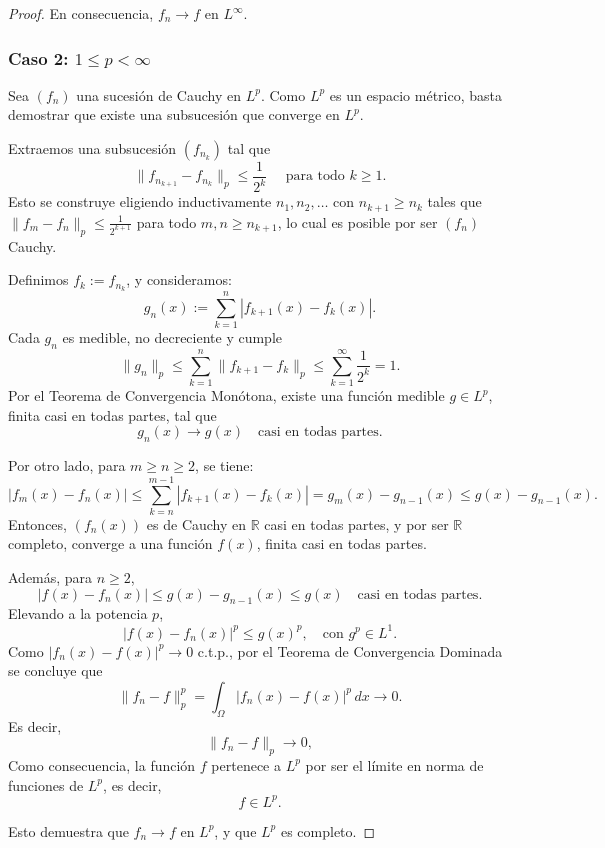 \begin{proof}
En consecuencia, \( f_n \to f \) en \( L^\infty \).

\subsubsection*{Caso 2: \( 1 \leq p < \infty \)}

Sea \( (f_n) \) una sucesión de Cauchy en \( L^p \). Como \( L^p \) es un espacio métrico, basta demostrar que existe una subsucesión que converge en \( L^p \).

Extraemos una subsucesión \( (f_{n_k}) \) tal que
\[
\|f_{n_{k+1}} - f_{n_k}\|_p \leq \frac{1}{2^k} \quad \text{ para todo } k \geq 1.
\]
Esto se construye eligiendo inductivamente \( n_1, n_2, \dots \) con \( n_{k+1} \geq n_k \) tales que \( \|f_m - f_n\|_p \leq \frac{1}{2^{k+1}} \) para todo \( m, n \geq n_{k+1} \), lo cual es posible por ser \( (f_n) \) Cauchy.

Definimos \( f_k := f_{n_k} \), y consideramos:
\[
g_n(x) := \sum_{k=1}^n |f_{k+1}(x) - f_k(x)|.
\]
Cada \( g_n \) es medible, no decreciente y cumple
\[
\|g_n\|_p \leq \sum_{k=1}^n \|f_{k+1} - f_k\|_p \leq \sum_{k=1}^\infty \frac{1}{2^k} = 1.
\]
Por el Teorema de Convergencia Monótona, existe una función medible \( g \in L^p \), finita casi en todas partes, tal que
\[
g_n(x) \to g(x) \quad \text{casi en todas partes}.
\]

Por otro lado, para \( m \geq n \geq 2 \), se tiene:
\[
|f_m(x) - f_n(x)| \leq \sum_{k=n}^{m-1} |f_{k+1}(x) - f_k(x)| = g_m(x) - g_{n-1}(x) \leq g(x) - g_{n-1}(x).
\]
Entonces, \( (f_n(x)) \) es de Cauchy en \( \mathbb{R} \) casi en todas partes, y por ser \( \mathbb{R} \) completo, converge a una función \( f(x) \), finita casi en todas partes.

Además, para \( n \geq 2 \),
\[
|f(x) - f_n(x)| \leq g(x) - g_{n-1}(x)\leq g(x) \quad \text{casi en todas partes}.
\]
Elevando a la potencia \( p \),
\[
|f(x) - f_n(x)|^p \leq g(x)^p, \quad \text{con } g^p \in L^1.
\]
Como \( |f_n(x) - f(x)|^p \to 0 \) c.t.p., por el Teorema de Convergencia Dominada se concluye que
\[
\|f_n - f\|_p^p = \int_\Omega |f_n(x) - f(x)|^p \, dx \to 0.
\]
Es decir,
\[
\|f_n - f\|_p \to 0,
\]
Como consecuencia, la función \( f \) pertenece a \( L^p \) por ser el límite en norma de funciones de \( L^p \), es decir,
\[
f \in L^p.
\]

Esto demuestra que \( f_n \to f \) en \( L^p \), y que \( L^p \) es completo.





\end{proof}
